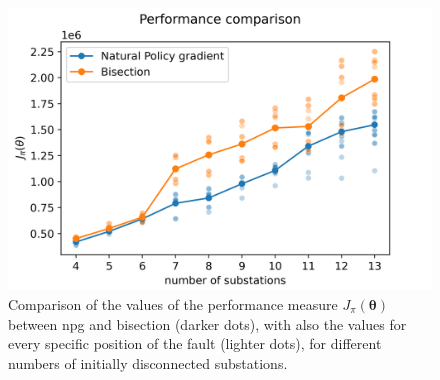 \begin{figure}[htb]
    \centering
    \includegraphics[scale=0.8]{chapters/figures/comparison_graph_scatterplot.png}
    \caption{Comparison of the values of the performance measure $J_\pi (\boldsymbol \theta)$ between \acrshort{npg} and bisection (darker dots), with also the values for every specific position of the fault (lighter dots), for different numbers of initially disconnected substations.}
    \label{fig:scatterplot}
\end{figure}